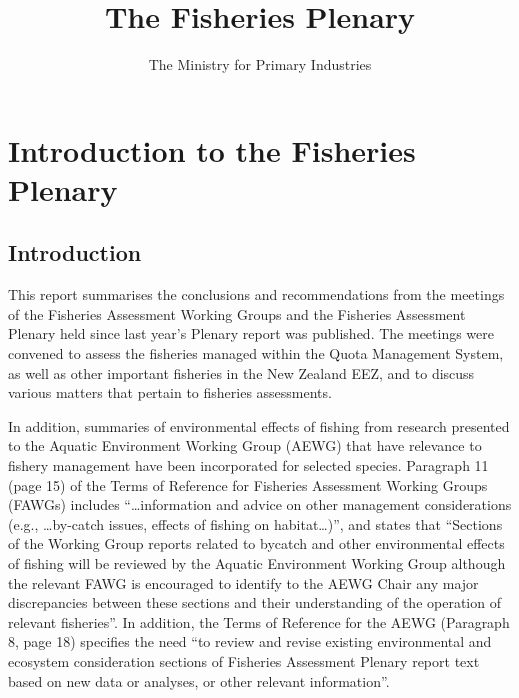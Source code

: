 \documentclass{mpi-plenary}
\title{The Fisheries Plenary}{The Fisheries Plenary}
\subtitle{}
\author{The Ministry for Primary Industries}
\theoremstyle{definition}
\theoremstyle{definition}
\theoremstyle{definition}
\theoremstyle{remark}
\begin{document}
\maketitle

\thispagestyle{empty}

\setlength{\abovedisplayskip}{-5pt}
\setlength{\abovedisplayshortskip}{-5pt}

{
\hypersetup{linkcolor=}
\setcounter{tocdepth}{2}
\tableofcontents
}
\listoftables
\listoffigures
\chapter{Introduction to the Fisheries
Plenary}\label{introduction-to-the-fisheries-plenary}

\section{Introduction}\label{introduction}

This report summarises the conclusions and recommendations from the
meetings of the Fisheries Assessment Working Groups and the Fisheries
Assessment Plenary held since last year's Plenary report was published.
The meetings were convened to assess the fisheries managed within the
Quota Management System, as well as other important fisheries in the New
Zealand EEZ, and to discuss various matters that pertain to fisheries
assessments.

In addition, summaries of environmental effects of fishing from research
presented to the Aquatic Environment Working Group (AEWG) that have
relevance to fishery management have been incorporated for selected
species. Paragraph 11 (page 15) of the Terms of Reference for Fisheries
Assessment Working Groups (FAWGs) includes ``\ldots{}information and
advice on other management considerations (e.g., \ldots{}by-catch
issues, effects of fishing on habitat\ldots{})'', and states that
``Sections of the Working Group reports related to bycatch and other
environmental effects of fishing will be reviewed by the Aquatic
Environment Working Group although the relevant FAWG is encouraged to
identify to the AEWG Chair any major discrepancies between these
sections and their understanding of the operation of relevant
fisheries''. In addition, the Terms of Reference for the AEWG (Paragraph
8, page 18) specifies the need ``to review and revise existing
environmental and ecosystem consideration sections of Fisheries
Assessment Plenary report text based on new data or analyses, or other
relevant information''.
\end{document}
